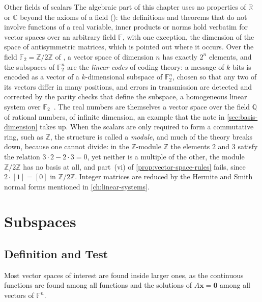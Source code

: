 \begin{note}{Other fields of scalars}
The algebraic part of this chapter uses no properties of $\mathbb R$ or $\mathbb C$ beyond the axioms of a field (): the definitions and theorems that do not involve functions of a real variable, inner products or norms hold verbatim for vector spaces over an arbitrary field $\mathbb F$, with one exception, the dimension of the space of antisymmetric matrices, which is pointed out where it occurs. Over the field $\mathbb F_2=\mathbb Z/2\mathbb Z$ of , a vector space of dimension $n$ has exactly $2^n$ elements, and the subspaces of $\mathbb F_2^n$ are the \emph{linear codes} of coding theory: a message of $k$ bits is encoded as a vector of a $k$-dimensional subspace of $\mathbb F_2^n$, chosen so that any two of its vectors differ in many positions, and errors in transmission are detected and corrected by the parity checks that define the subspace, a homogeneous linear system over $\mathbb F_2$~\cite{macwilliams1977}. The real numbers are themselves a vector space over the field $\mathbb Q$ of rational numbers, of infinite dimension, an example that the note in \cref{sec:basis-dimension} takes up. When the scalars are only required to form a commutative ring, such as $\mathbb Z$, the structure is called a \emph{module}, and much of the theory breaks down, because one cannot divide: in the $\mathbb Z$-module $\mathbb Z$ the elements $2$ and $3$ satisfy the relation $3\cdot2-2\cdot3=0$, yet neither is a multiple of the other, the module $\mathbb Z/2\mathbb Z$ has no basis at all, and part~(vi) of \cref{prop:vector-space-rules} fails, since $2\cdot[1]=[0]$ in $\mathbb Z/2\mathbb Z$. Integer matrices are reduced by the Hermite and Smith normal forms mentioned in \cref{ch:linear-systems}.
\end{note}

\section{Subspaces}
\label{sec:subspaces}

\subsection{Definition and Test}

Most vector spaces of interest are found inside larger ones, as the continuous functions are found among all functions and the solutions of $A\mathbf x=\mathbf 0$ among all vectors of $\mathbb F^n$.

